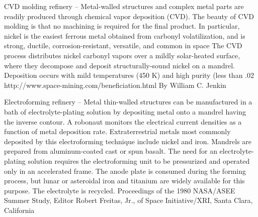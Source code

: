 \documentclass[a4paper]{book}
\begin{document}
CVD molding refinery – Metal-walled structures and complex metal parts are readily produced through chemical vapor deposition (CVD). The beauty of CVD molding is that no machining is required for the final product. In particular, nickel is the easiest ferrous metal obtained from carbonyl volatilization, and is strong, ductile, corrosion-resistant, versatile, and common in space The CVD process distributes nickel carbonyl vapors over a mildly solar-heated surface, where they decompose and deposit structurally-sound nickel on a mandrel. Deposition occurs with mild temperatures (450 K) and high purity (less than .02%
http://www.space-mining.com/beneficiation.html By William C. Jenkin
 
Electroforming refinery – Metal thin-walled structures can be manufactured in a bath of electrolyte-plating solution by depositing metal onto a mandrel having the inverse contour. A robonaut monitors the electrical current densities as a function of metal deposition rate. Extraterrestrial metals most commonly deposited by this electroforming technique include nickel and iron.  Mandrels are prepared from aluminum-coated cast or spun basalt. The need for an electrolyte-plating solution requires the electroforming unit to be pressurized and operated only in an accelerated frame. The anode plate is consumed during the forming process, but lunar or asteroidal iron and titanium are widely available for this purpose. The electrolyte is recycled. Proceedings of the 1980 NASA/ASEE Summer Study, Editor Robert Freitas, Jr., of Space Initiative/XRI, Santa Clara, California
 
\end{document}
